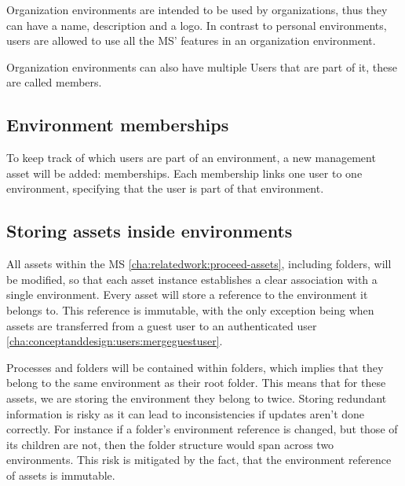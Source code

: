 \begin{itemize}
Organization environments are intended to be used by organizations, thus they can have a
name, description and a logo.
In contrast to personal environments, users are allowed to use all the MS' features in
an organization environment.


Organization environments can also have multiple Users that are part of it, these are
called members.

\subsection{Environment memberships}
\label{cha:conceptanddesign:environments:memberships}

To keep track of which users are part of an environment, a new management asset will be
added: memberships.
Each membership links one user to one environment, specifying that the user is part of
that environment.

\subsection{Storing assets inside environments}
\label{cha:conceptanddesign:environments:storing-assets}

All assets within the MS \ref{cha:relatedwork:proceed-assets}, including folders,
will be modified, so that each asset instance establishes a clear association with a single environment.
Every asset will store a reference to the environment it belongs to.
This reference is immutable, with the only exception being when assets are transferred
from a guest user to an authenticated user \ref{cha:conceptanddesign:users:mergeguestuser}.

Processes and folders will be contained within folders, which implies that they belong to
the same environment as their root folder.
This means that for these assets, we are storing the environment they belong to twice.
Storing redundant information is risky as it can lead to inconsistencies if updates aren't
done correctly.
For instance if a folder's environment reference is changed, but those of its children
are not, then the folder structure would span across two environments.
This risk is mitigated by the fact, that the environment reference of assets is immutable.


\end{itemize}
